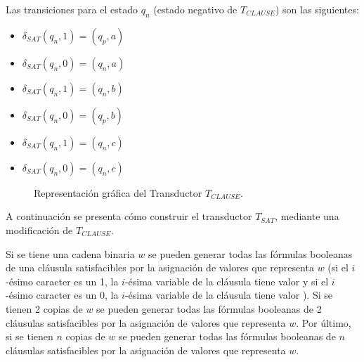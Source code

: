 Las transiciones para el estado $q_n$ (estado negativo de $T_{CLAUSE}$) son las siguientes:
\begin{multicols}{2}
    \begin{itemize}
        \item $\delta_{SAT}(q_{n},1)=(q_{p},a)$
        \item $\delta_{SAT}(q_{n},0)=(q_{n},a)$
        \item $\delta_{SAT}(q_{n},1)=(q_{n},b)$
        \item $\delta_{SAT}(q_{n},0)=(q_{p},b)$
        \item $\delta_{SAT}(q_{n},1)=(q_{n},c)$
        \item $\delta_{SAT}(q_{n},0)=(q_{n},c)$
    \end{itemize}
\end{multicols}

\begin{figure}[h]
    \centering  \begin{otherlanguage}{english}
    \end{otherlanguage}
    \caption{Representación gráfica del Transductor $T_{CLAUSE}$.}
    \label{fig:transducer_clause} %
\end{figure}

A continuación se presenta cómo construir el transductor $T_{SAT}$, mediante una modificación de $T_{CLAUSE}$.

Si se tiene una cadena binaria $w$ se pueden generar todas las fórmulas booleanas de una cláusula 
satisfacibles por la asignación de valores que representa $w$ (si el $i$-ésimo caracter es un 1, la 
$i$-ésima variable de la cláusula tiene valor \true{} y si el $i$-ésimo caracter es un 0, la $i$-ésima 
variable de la cláusula tiene valor \false{}). Si se tienen 2 copias de $w$ se pueden generar todas las fórmulas 
booleanas de 2 cláusulas satisfacibles por la asignación de valores que representa $w$. 
Por último, si se tienen $n$ copias de $w$ se pueden generar todas las fórmulas booleanas de $n$ cláusulas satisfacibles por la asignación de valores que representa $w$.

